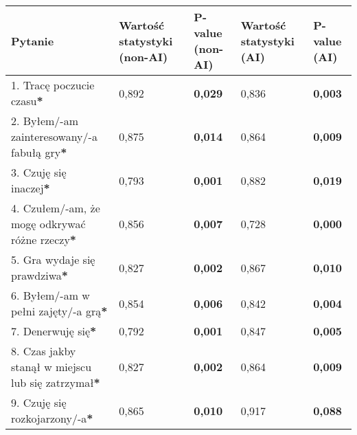 \begin{table}[!h]
    \begin{center}
        \begin{tabular}{|m{10em}|m{5em}|m{5em}|m{5em}|m{5em}|}
            \hline
            Pytanie                                                                     & Wartość statystyki (non-AI) & P-value (non-AI) & Wartość statystyki (AI) & P-value (AI)   \\
            \hline
            1. Tracę poczucie czasu\textbf{*}                                           & 0,892                       & \textbf{0,029}   & 0,836                   & \textbf{0,003} \\
            2. Byłem/-am \newline zainteresowany/-a fabułą gry\textbf{*}                & 0,875                       & \textbf{0,014}   & 0,864                   & \textbf{0,009} \\
            3. Czuję się inaczej\textbf{*}                                              & 0,793                       & \textbf{0,001}   & 0,882                   & \textbf{0,019} \\
            4. Czułem/-am, że mogę odkrywać różne rzeczy\textbf{*}                      & 0,856                       & \textbf{0,007}   & 0,728                   & \textbf{0,000} \\
            5. Gra wydaje się prawdziwa\textbf{*}                                       & 0,827                       & \textbf{0,002}   & 0,867                   & \textbf{0,010} \\
            6. Byłem/-am \newline w pełni zajęty/-a grą\textbf{*}                       & 0,854                       & \textbf{0,006}   & 0,842                   & \textbf{0,004} \\
            7. Denerwuję się\textbf{*}                                                  & 0,792                       & \textbf{0,001}   & 0,847                   & \textbf{0,005} \\
            8. Czas jakby stanął w miejscu lub się zatrzymał\textbf{*}                  & 0,827                       & \textbf{0,002}   & 0,864                   & \textbf{0,009} \\
            9. Czuję się \newline rozkojarzony/-a\textbf{*}                             & 0,865                       & \textbf{0,010}   & 0,917                   & \textbf{0,088} \\

\end{tabular}
\end{center}
\end{table}
